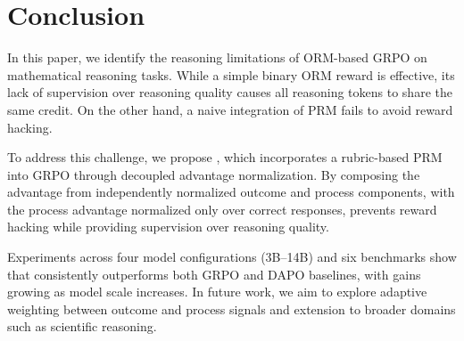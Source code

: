 \section{Conclusion}
\label{sec:conclusion}

In this paper, we identify the reasoning limitations of ORM-based GRPO on mathematical reasoning tasks. While a simple binary ORM reward is effective, its lack of supervision over reasoning quality causes all reasoning tokens to share the same credit. On the other hand, a naive integration of PRM fails to avoid reward hacking.

To address this challenge, we propose \method{}, which incorporates a rubric-based PRM into GRPO through decoupled advantage normalization. By composing the advantage from independently normalized outcome and process components, with the process advantage normalized only over correct responses, \method{} prevents reward hacking while providing supervision over reasoning quality.

Experiments across four model configurations (3B--14B) and six benchmarks show that \method{} consistently outperforms both GRPO and DAPO baselines, with gains growing as model scale increases. In future work, we aim to explore adaptive weighting between outcome and process signals and extension to broader domains such as scientific reasoning.
